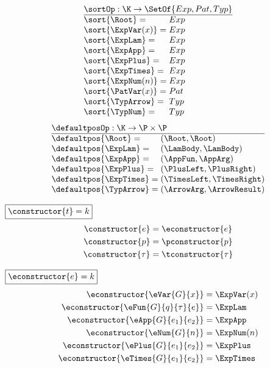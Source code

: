 \[
  \arraycolsep=0pt
  \begin{array}{ll}
    \multicolumn{2}{l}{\sortOp : \K \to \SetOf{Exp, Pat, Typ}} \\
    \hline
    \sort{\Root}={} & Exp \\
    \sort{\ExpVar(x)}={} & Exp \\
    \sort{\ExpLam}={} & Exp \\
    \sort{\ExpApp}={} & Exp \\
    \sort{\ExpPlus}={} & Exp \\
    \sort{\ExpTimes}={} & Exp \\
    \sort{\ExpNum(n)}={} & Exp \\
    \sort{\PatVar(x)}={} & Pat \\
    \sort{\TypArrow}={} & Typ \\
    \sort{\TypNum}={} & Typ \\
  \end{array}
\]
%
%
\[
  \arraycolsep=0pt
  \begin{array}{ll}
    \multicolumn{2}{l}{\defaultposOp : \K \to \P \times \P} \\
    \hline
    \defaultpos{\Root}={} & (\Root, \Root) \\
    \defaultpos{\ExpLam}={} & (\LamBody, \LamBody) \\
    \defaultpos{\ExpApp}={} & (\AppFun, \AppArg) \\
    \defaultpos{\ExpPlus}={} & (\PlusLeft, \PlusRight) \\
    \defaultpos{\ExpTimes}={} & (\TimesLeft, \TimesRight) \\
    \defaultpos{\TypArrow}={} & (\ArrowArg, \ArrowResult) \\
  \end{array}
\]
%

\noindent $\boxed{\constructor{t} = k}$
%
\begin{align*}
  \constructor{e} &= \econstructor{e} \\
  \constructor{p} &= \pconstructor{p} \\
  \constructor{\tau} &= \tconstructor{\tau}
\end{align*}

\noindent $\boxed{\econstructor{e} = k}$
%
\begin{align*}
  \econstructor{\eVar{G}{x}} &= \ExpVar(x) \\
  \econstructor{\eFun{G}{q}{\tau}{e}} &= \ExpLam \\
  \econstructor{\eApp{G}{e_1}{e_2}} &= \ExpApp \\
  \econstructor{\eNum{G}{n}} &= \ExpNum(n) \\
  \econstructor{\ePlus{G}{e_1}{e_2}} &= \ExpPlus \\
  \econstructor{\eTimes{G}{e_1}{e_2}} &= \ExpTimes
\end{align*}

